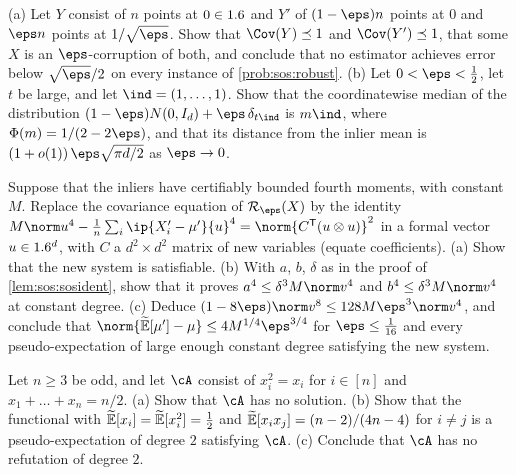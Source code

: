 \begin{refsection}
\begin{exercises}
\item\label{ex:sos:lower} \consolidation (a) Let $Y$ consist of $n$ points at $0\in1.6$ and $Y'$ of $(1-\eps)n$ points at $0$ and $\eps n$ points at $1/\sqrt\eps$. Show that $\Cov(Y)\preceq1$ and $\Cov(Y')\preceq1$, that some $X$ is an $\eps$-corruption of both, and conclude that no estimator achieves error below $\sqrt\eps/2$ on every instance of \cref{prob:sos:robust}. (b) Let $0<\eps<\frac12$, let $t$ be large, and let $\ind=(1,\dots,1)$. Show that the coordinatewise median of the distribution $(1-\eps)N(0,I_d)+\eps\,\delta_{t\ind}$ is $m\ind$, where $\Phi(m)=1/(2-2\eps)$, and that its distance from the inlier mean is $(1+o(1))\,\eps\sqrt{\pi d/2}$ as $\eps\to0$.

\item\label{ex:sos:fourth} \consolidation\hard Suppose that the inliers have certifiably bounded fourth moments, with constant $M$. Replace the covariance equation of $\sosR_\eps(X)$ by the identity $M\norm u^4-\frac1n\sum_i\ip{X_i'-\mu'}{u}^4=\norm{C^{\mathsf T}(u\otimes u)}^2$ in a formal vector $u\in1.6^d$, with $C$ a $d^2\times d^2$ matrix of new variables (equate coefficients). (a) Show that the new system is satisfiable. (b) With $a$, $b$, $\delta$ as in the proof of \cref{lem:sos:sosident}, show that it proves $a^4\le\delta^3M\norm v^4$ and $b^4\le\delta^3M\norm v^4$ at constant degree. (c) Deduce $(1-8\eps)\norm v^8\le128M\eps^3\norm v^4$, and conclude that $\norm{\sosPE[\mu']-\mu}\le4M^{1/4}\eps^{3/4}$ for $\eps\le\frac1{16}$ and every pseudo-expectation of large enough constant degree satisfying the new system. 

\item\label{ex:sos:knapsack} \consolidation Let $n\ge3$ be odd, and let $\cA$ consist of $x_i^2=x_i$ for $i\in[n]$ and $x_1+\dots+x_n=n/2$. (a) Show that $\cA$ has no solution. (b) Show that the functional with $\widetilde{\mathbb{E}}[x_i]=\widetilde{\mathbb{E}}[x_i^2]=\frac12$ and $\widetilde{\mathbb{E}}[x_ix_j]=(n-2)/(4n-4)$ for $i\ne j$ is a pseudo-expectation of degree $2$ satisfying $\cA$. (c) Conclude that $\cA$ has no refutation of degree $2$.


\end{exercises}
\end{refsection}

